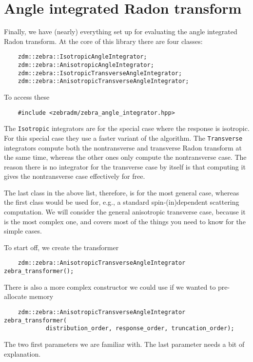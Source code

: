 \documentclass{article}
\begin{document}
\section{Angle integrated Radon transform}

Finally, we have (nearly) everything set up for evaluating the angle integrated Radon transform. At the core of this library there are four classes:
\begin{verbatim}
    zdm::zebra::IsotropicAngleIntegrator;
    zdm::zebra::AnisotropicAngleIntegrator;
    zdm::zebra::IsotropicTransverseAngleIntegrator;
    zdm::zebra::AnisotropicTransverseAngleIntegrator;
\end{verbatim}
To access these
\begin{verbatim}
    #include <zebradm/zebra_angle_integrator.hpp>
\end{verbatim}
The \texttt{Isotropic} integrators are for the special case where the response is isotropic. For this special case they use a faster variant of the algorithm. 
The \texttt{Transverse} integrators compute both the nontransverse and transverse Radon transform at the same time, whereas the other ones only compute the nontransverse case. The reason there is no integrator for the transverse case by itself is that computing it gives the nontransverse case effectively for free. 

The last class in the above list, therefore, is for the most general case, whereas the first class would be used for, e.g., a standard spin-(in)dependent scattering computation. We will consider the general anisotropic transverse case, because it is the most complex one, and covers most of the things you need to know for the simple cases.

To start off, we create the transformer
\begin{verbatim}
    zdm::zebra::AnisotropicTransverseAngleIntegrator zebra_transformer();
\end{verbatim}
There is also a more complex constructor we could use if we wanted to pre-allocate memory
\begin{verbatim}
    zdm::zebra::AnisotropicTransverseAngleIntegrator zebra_transformer(
            distribution_order, response_order, truncation_order);
\end{verbatim}
The two first parameters we are familiar with. The last parameter needs a bit of explanation.
\end{document}
